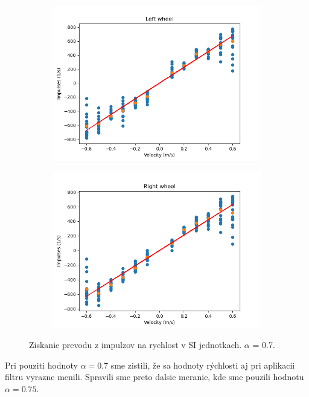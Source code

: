 \begin{figure}[!htbp]
	\begin{subfigure}{0.5\textwidth}
		\includegraphics[width=\textwidth]{img/lw_07250.png}
	\end{subfigure}
	\hfill
	\begin{subfigure}{0.5\textwidth}
		\includegraphics[width=\textwidth]{img/rw_07250.png}
	\end{subfigure}
	\caption{Ziskanie prevodu z impulzov na rychlost v SI jednotkach. \(\alpha\) = 0.7.}
	\label{fig:rw_lw_07250}
\end{figure}

\newpage

Pri pouziti hodnoty \(\alpha = 0.7\) sme zistili, že sa hodnoty rýchlosti aj pri aplikacii filtru vyrazne menili.
Spravili sme preto dalsie meranie, kde sme pouzili hodnotu \(\alpha = 0.75\).


